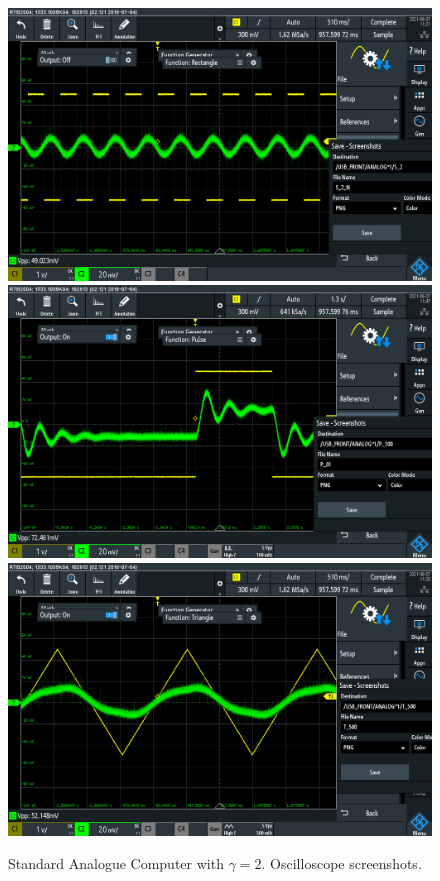 \documentclass[journal]{Imperial_lab_report}
\begin{document}
\begin{appendices}
\begin{figure}[h]
            \includegraphics[scale = 0.10]{G2_S_2000_pic.PNG}
            \includegraphics[scale = 0.10]{G2_P_100_pic.PNG}
            \includegraphics[scale = 0.10]{G2_T_500_pic.PNG}
            \caption{Standard Analogue Computer with $\gamma = 2$. Oscilloscope screenshots.}
        \end{figure}
        \begin{figure}[ht]
            

\end{figure}
\end{appendices}
\end{document}
